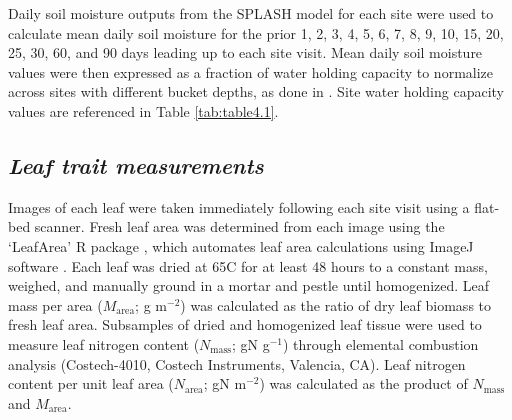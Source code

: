 Daily soil moisture outputs from the SPLASH model for each site were used to calculate mean daily soil moisture for the prior 1, 2, 3, 4, 5, 6, 7, 8, 9, 10, 15, 20, 25, 30, 60, and 90 days leading up to each site visit. Mean daily soil moisture values were then expressed as a fraction of water holding capacity to normalize across sites with different bucket depths, as done in . Site water holding capacity values are referenced in Table \ref{tab:table4.1}.

\subsection{\textit{Leaf trait measurements}}
\noindent Images of each leaf were taken immediately following each site visit using a flat-bed scanner. Fresh leaf area was determined from each image using the `LeafArea' R package , which automates leaf area calculations using ImageJ software . Each leaf was dried at 65\textdegree{}C for at least 48 hours to a constant mass, weighed, and manually ground in a mortar and pestle until homogenized. Leaf mass per area ($M_\mathrm{area}$; g m$^{-2}$) was calculated as the ratio of dry leaf biomass to fresh leaf area. Subsamples of dried and homogenized leaf tissue were used to measure leaf nitrogen content ($N_\mathrm{mass}$; gN g$^{-1}$) through elemental combustion analysis (Costech-4010, Costech Instruments, Valencia, CA). Leaf nitrogen content per unit leaf area ($N_\mathrm{area}$; gN m$^{-2}$) was calculated as the product of $N_\mathrm{mass}$ and $M_\mathrm{area}$.
    
